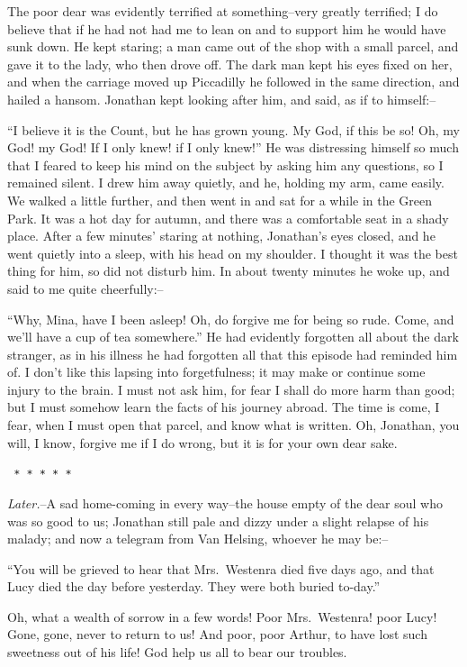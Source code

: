 \documentclass[12pt,openright]{book}
\begin{document}
The poor dear was evidently terrified at something–very greatly terrified; I do believe that if he had not had me to lean on and to support him he would have sunk down. He kept staring; a man came out of the shop with a small parcel, and gave it to the lady, who then drove off. The dark man kept his eyes fixed on her, and when the carriage moved up Piccadilly he followed in the same direction, and hailed a hansom. Jonathan kept looking after him, and said, as if to himself:–

“I believe it is the Count, but he has grown young. My God, if this be so! Oh, my God! my God! If I only knew! if I only knew!” He was distressing himself so much that I feared to keep his mind on the subject by asking him any questions, so I remained silent. I drew him away quietly, and he, holding my arm, came easily. We walked a little further, and then went in and sat for a while in the Green Park. It was a hot day for autumn, and there was a comfortable seat in a shady place. After a few minutes’ staring at nothing, Jonathan’s eyes closed, and he went quietly into a sleep, with his head on my shoulder. I thought it was the best thing for him, so did not disturb him. In about twenty minutes he woke up, and said to me quite cheerfully:–

“Why, Mina, have I been asleep! Oh, do forgive me for being so rude. Come, and we’ll have a cup of tea somewhere.” He had evidently forgotten all about the dark stranger, as in his illness he had forgotten all that this episode had reminded him of. I don’t like this lapsing into forgetfulness; it may make or continue some injury to the brain. I must not ask him, for fear I shall do more harm than good; but I must somehow learn the facts of his journey abroad. The time is come, I fear, when I must open that parcel, and know what is written. Oh, Jonathan, you will, I know, forgive me if I do wrong, but it is for your own dear sake.

\texttt{   *       *       *       *       *}

\textit{Later.}–A sad home-coming in every way–the house empty of the dear soul who was so good to us; Jonathan still pale and dizzy under a slight relapse of his malady; and now a telegram from Van Helsing, whoever he may be:–

“You will be grieved to hear that Mrs. Westenra died five days ago, and that Lucy died the day before yesterday. They were both buried to-day.”

Oh, what a wealth of sorrow in a few words! Poor Mrs. Westenra! poor Lucy! Gone, gone, never to return to us! And poor, poor Arthur, to have lost such sweetness out of his life! God help us all to bear our troubles.
\end{document}

